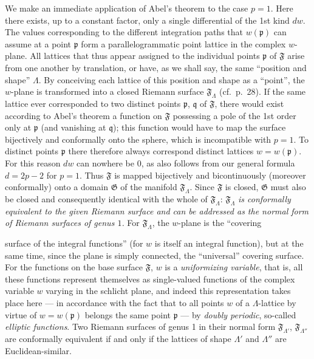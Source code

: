 \documentclass{article}
\begin{document}
We make an immediate application of Abel's theorem to the case $p = 1$. Here there exists, up to a constant factor, only a single differential of the 1st kind $dw$. The values corresponding to the different integration paths that $w(\mathfrak{p})$ can assume at a point $\mathfrak{p}$ form a parallelogrammatic point lattice in the complex $w$-plane. All lattices that thus appear assigned to the individual points $\mathfrak{p}$ of $\mathfrak{F}$ arise from one another by translation, or have, as we shall say, the same ``position and shape'' $\Lambda$. By conceiving each lattice of this position and shape as a ``point'', the $w$-plane is transformed into a closed Riemann surface $\mathfrak{F}_\Lambda$ (cf.\ p.~28). If the same lattice ever corresponded to two distinct points $\mathfrak{p}$, $\mathfrak{q}$ of $\mathfrak{F}$, there would exist according to Abel's theorem a function on $\mathfrak{F}$ possessing a pole of the 1st order only at $\mathfrak{p}$ (and vanishing at $\mathfrak{q}$); this function would have to map the surface bijectively and conformally onto the sphere, which is incompatible with $p = 1$. To distinct points $\mathfrak{p}$ there therefore always correspond distinct lattices $w = w(\mathfrak{p})$. For this reason $dw$ can nowhere be $0$, as also follows from our general formula $d = 2p - 2$ for $p = 1$. Thus $\mathfrak{F}$ is mapped bijectively and bicontinuously (moreover conformally) onto a domain $\mathfrak{G}$ of the manifold $\mathfrak{F}_\Lambda$. Since $\mathfrak{F}$ is closed, $\mathfrak{G}$ must also be closed and consequently identical with the whole of $\mathfrak{F}_\Lambda$: $\mathfrak{F}_\Lambda$ \emph{is conformally equivalent to the given Riemann surface and can be addressed as the normal form of Riemann surfaces of genus $1$.} For $\mathfrak{F}_\Lambda$, the $w$-plane is the ``covering

surface of the integral functions'' (for $w$ is itself an integral function), but at the same time, since the plane is simply connected, the ``universal'' covering surface. For the functions on the base surface $\mathfrak{F}$, $w$ is a \emph{uniformizing variable}, that is, all these functions represent themselves as single-valued functions of the complex variable $w$ varying in the schlicht plane, and indeed this representation takes place here --- in accordance with the fact that to all points $w$ of a $\Lambda$-lattice by virtue of $w = w(\mathfrak{p})$ belongs the same point $\mathfrak{p}$ --- by \emph{doubly periodic}, so-called \emph{elliptic functions}. Two Riemann surfaces of genus 1 in their normal form $\mathfrak{F}_{\Lambda'}$, $\mathfrak{F}_{\Lambda''}$ are conformally equivalent if and only if the lattices of shape $\Lambda'$ and $\Lambda''$ are Euclidean-similar.
\end{document}
